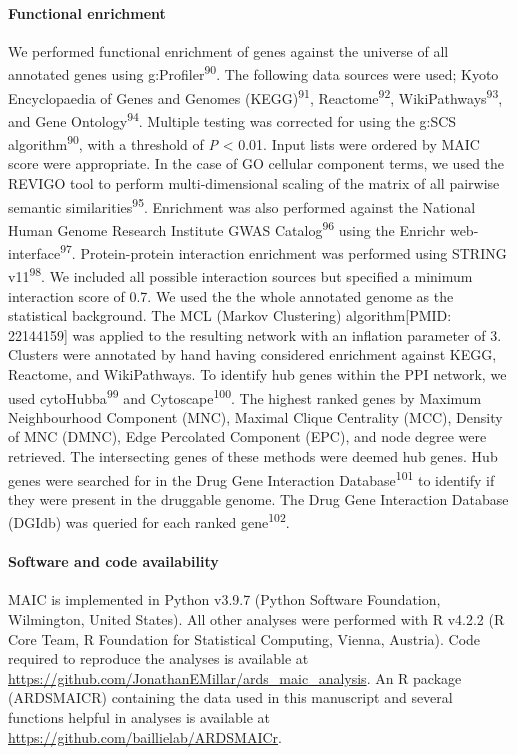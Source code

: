 \documentclass[
  11,
  a4paper,
]{article}
\let\oldparagraph\paragraph
\renewcommand{\paragraph}[1]{\oldparagraph{#1}\mbox{}}
\begin{document}
\paragraph{Functional enrichment}\label{functional-enrichment-1}

We performed functional enrichment of genes against the universe of all
annotated genes using g:Profiler\textsuperscript{90}. The following data
sources were used; Kyoto Encyclopaedia of Genes and Genomes
(KEGG)\textsuperscript{91}, Reactome\textsuperscript{92},
WikiPathways\textsuperscript{93}, and Gene Ontology\textsuperscript{94}.
Multiple testing was corrected for using the g:SCS
algorithm\textsuperscript{90}, with a threshold of \emph{P} \textless{}
0.01. Input lists were ordered by MAIC score were appropriate. In the
case of GO cellular component terms, we used the REVIGO tool to perform
multi-dimensional scaling of the matrix of all pairwise semantic
similarities\textsuperscript{95}. Enrichment was also performed against
the National Human Genome Research Institute GWAS
Catalog\textsuperscript{96} using the Enrichr
web-interface\textsuperscript{97}. Protein-protein interaction
enrichment was performed using STRING v11\textsuperscript{98}. We
included all possible interaction sources but specified a minimum
interaction score of 0.7. We used the the whole annotated genome as the
statistical background. The MCL (Markov Clustering) algorithm{[}PMID:
22144159{]} was applied to the resulting network with an inflation
parameter of 3. Clusters were annotated by hand having considered
enrichment against KEGG, Reactome, and WikiPathways. To identify hub
genes within the PPI network, we used cytoHubba\textsuperscript{99} and
Cytoscape\textsuperscript{100}. The highest ranked genes by Maximum
Neighbourhood Component (MNC), Maximal Clique Centrality (MCC), Density
of MNC (DMNC), Edge Percolated Component (EPC), and node degree were
retrieved. The intersecting genes of these methods were deemed hub
genes. Hub genes were searched for in the Drug Gene Interaction
Database\textsuperscript{101} to identify if they were present in the
druggable genome. The Drug Gene Interaction Database (DGIdb) was queried
for each ranked gene\textsuperscript{102}.

\paragraph{Software and code
availability}\label{software-and-code-availability}

MAIC is implemented in Python v3.9.7 (Python Software Foundation,
Wilmington, United States). All other analyses were performed with R
v4.2.2 (R Core Team, R Foundation for Statistical Computing, Vienna,
Austria). Code required to reproduce the analyses is available at
\url{https://github.com/JonathanEMillar/ards_maic_analysis}. An R
package (ARDSMAICR) containing the data used in this manuscript and
several functions helpful in analyses is available at
\url{https://github.com/baillielab/ARDSMAICr}.
\end{document}

